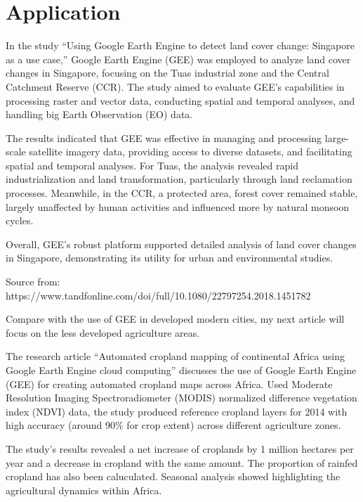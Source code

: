 \documentclass[
  letterpaper,
  DIV=11,
  numbers=noendperiod]{scrreprt}
\begin{document}

\chapter{Application}\label{application-2}

In the study ``Using Google Earth Engine to detect land cover change:
Singapore as a use case,'' Google Earth Engine (GEE) was employed to
analyze land cover changes in Singapore, focusing on the Tuas industrial
zone and the Central Catchment Reserve (CCR). The study aimed to
evaluate GEE's capabilities in processing raster and vector data,
conducting spatial and temporal analyses, and handling big Earth
Observation (EO) data.

The results indicated that GEE was effective in managing and processing
large-scale satellite imagery data, providing access to diverse
datasets, and facilitating spatial and temporal analyses. For Tuas, the
analysis revealed rapid industrialization and land transformation,
particularly through land reclamation processes. Meanwhile, in the CCR,
a protected area, forest cover remained stable, largely unaffected by
human activities and influenced more by natural monsoon cycles.

Overall, GEE's robust platform supported detailed analysis of land cover
changes in Singapore, demonstrating its utility for urban and
environmental studies.

Source from:
https://www.tandfonline.com/doi/full/10.1080/22797254.2018.1451782

Compare with the use of GEE in developed modern cities, my next article
will focus on the less developed agriculture areas.

The research article ``Automated cropland mapping of continental Africa
using Google Earth Engine cloud computing'' discusses the use of Google
Earth Engine (GEE) for creating automated cropland maps across Africa.
Used Moderate Resolution Imaging Spectroradiometer (MODIS) normalized
difference vegetation index (NDVI) data, the study produced reference
cropland layers for 2014 with high accuracy (around 90\% for crop
extent) across different agriculture zones.

The study's results revealed a net increase of croplands by 1 million
hectares per year and a decrease in cropland with the same amount. The
proportion of rainfed cropland has also been caluculated. Seasonal
analysis showed highlighting the agricultural dynamics within Africa.
\end{document}

